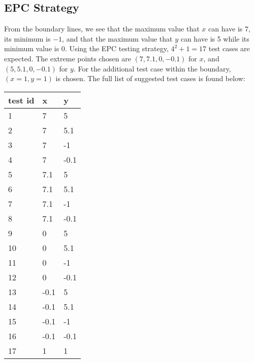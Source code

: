 \documentclass[letterpaper]{article}
\begin{document}
\subsection{EPC Strategy}
From the boundary lines, we see that the maximum value that $x$ can have is
$7$, its minimum is $-1$, and that the maximum value that $y$ can have is
5 while its minimum value is 0. Using the EPC testing strategy,
$4^2 + 1=17$ test cases are expected. The extreme points chosen are
$(7, 7.1, 0, -0.1)$ for $x$, and $(5, 5.1, 0, -0.1)$ for $y$.
For the additional test case within the boundary, $(x=1, y=1)$ is chosen.
The full list of suggested test cases is found below:


\begin{adjustbox}{center}
	\begin{tabular}{lll}
		test id & x    & y    \\ \hline
		1       & 7    & 5    \\
		2       & 7    & 5.1  \\
		3       & 7    & -1   \\
		4       & 7    & -0.1 \\
		5       & 7.1  & 5    \\
		6       & 7.1  & 5.1  \\
		7       & 7.1  & -1   \\
		8       & 7.1  & -0.1 \\
		9       & 0    & 5    \\
		10      & 0    & 5.1  \\
		11      & 0    & -1   \\
		12      & 0    & -0.1 \\
		13      & -0.1 & 5    \\
		14      & -0.1 & 5.1  \\
		15      & -0.1 & -1   \\
		16      & -0.1 & -0.1 \\
		17      & 1    & 1    \\
	\end{tabular}
\end{adjustbox}
\end{document}
